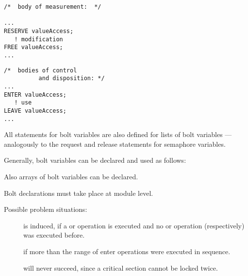 \begin{multicols}{2}
\begin{lstlisting}
/*  body of measurement:  */

...
RESERVE valueAccess;
   ! modification
FREE valueAccess;
...
\end{lstlisting}
\columnbreak
\begin{lstlisting}
/*  bodies of control
          and disposition: */
...
ENTER valueAccess;
   ! use
LEAVE valueAccess;
...
\end{lstlisting}
\end{multicols}

All statements for bolt variables are also defined for lists of bolt
variables --- analogously to the request and release statements for
semaphore variables.

Generally, bolt variables can be declared and used as follows:

\begin{grammarframe}

\end{grammarframe}

Also arrays of bolt variables can be declared.

Bolt declarations must take place at module level.

Possible problem situations:

\begin{description}
\item[] is induced, if a  or  operation
   is executed and no  or  operation (respectively) 
   was executed before.
\item [] if more than the range of  enter
   operations were executed in sequence.
\item[ ] will never succeed, since a
    critical section cannot be locked twice.
\end{description}

